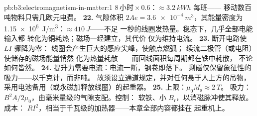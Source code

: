 \begin{solution}{pb:b3:electromagnetism-in-matter:1}
$8\,\text{小时}\times0.6$：$\approx\qty{3.2}{kWh}$ 每班——
移动数百吨物料只需几欧元电费。
\textbf{22.} 气隙体积 $2Ae = \qty{3.6e-4}{m^3}$，其能量密度为
\qty{1.15e6}{J/m^3}：$\approx\qty{410}{J}$——不足
一秒的线圈发热量。稳态下，几乎全部电能输入都
转化为铜耗热；磁场一经建立，其代价
仅为维持电流。
\textbf{23.} 断开电路使 $LI$ 骤降为零：
线圈会产生巨大的感应尖峰，使触点燃弧；
续流二极管（或电阻）使储存的磁场能量悄然
化为热量耗散——而回线面积每周期都在铁中耗散，
不论如何皆然。
\textbf{24.} 提升力需要电流：电流一断，钢卷即落下。
剩磁仅保留象征性的吸力——以千克计，而非吨。
故须设立通道规定，并对任何悬于人上方的吊物，
采用电池备用（或永磁加释放线圈）的起重器。
\textbf{25.} 上限：$\mu_0M_{\text{s}} \approx \qty{2}{T}$。
吸力：$B^2A/2\mu_0$，由毫米量级的气隙支配。控制：
软铁、小 $B_{\text{r}}$，以消磁脉冲使其释放。成本：
$RI^2$，相当于千瓦级的加热器——本章全部内容都挂在
起重机上。
\end{solution}
